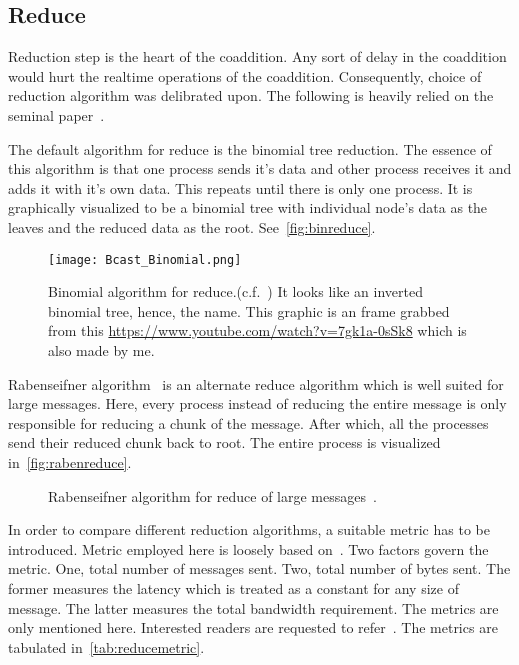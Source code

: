 \subsection {Reduce}
\label{ssub:reduce}

\par Reduction step is the heart of the coaddition. 
Any sort of delay in the coaddition would hurt the realtime operations of the coaddition. 
Consequently, choice of reduction algorithm was delibrated upon.
The following is heavily relied on the seminal paper~\cite{raben}.

\par The default \mpi algorithm for reduce is the binomial tree reduction. 
The essence of this algorithm is that one process sends it's data and other process receives it and adds it with it's own data.
This repeats until there is only one process. It is graphically visualized to be a binomial tree with individual node's data as the leaves and the reduced data as the root. 
See~\autoref{fig:binreduce}.

\begin{figure}
	\label{fig:binreduce}
	\centering
	\texttt{[image: Bcast\_Binomial.png]}
	\caption{Binomial algorithm for \mpi reduce.(c.f.~\cite{raben}) It looks like an inverted binomial tree, hence, the name.
		This graphic is an frame grabbed from this \href{youtube video}{https://www.youtube.com/watch?v=7gk1a-0sSk8} which is also made by me.
	}
\end{figure}

\par Rabenseifner algorithm~\cite{raben} is an alternate reduce algorithm which is well suited for large messages.
Here, every process instead of reducing the entire message is only responsible for reducing a chunk of the message.
After which, all the processes send their reduced chunk back to root.
The entire process is visualized in~\autoref{fig:rabenreduce}.

\begin{figure}
	\label{fig:rabenreduce}
	\caption{Rabenseifner algorithm for \mpi reduce of large messages~\cite{raben}.}
\end{figure}


\par In order to compare different reduction algorithms, a suitable metric has to be introduced.
Metric employed here is loosely based on~\cite{raben}. 
Two factors govern the metric. One, total number of messages sent. Two, total number of bytes sent.
The former measures the latency which is treated as a constant for any size of message. The latter measures the total bandwidth requirement.
The metrics are only mentioned here. Interested readers are requested to refer~\cite{raben}.
The metrics are tabulated in~\autoref{tab:reducemetric}.

